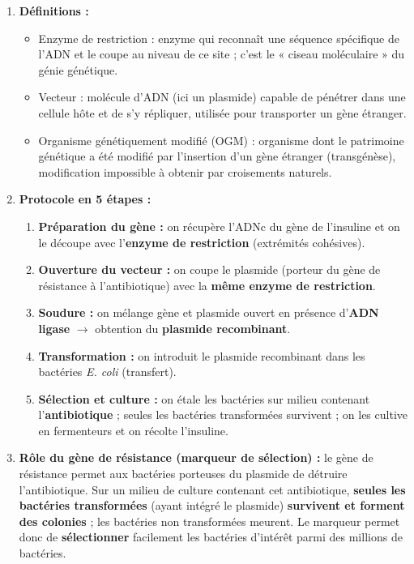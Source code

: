 \documentclass[11pt]{article}
\newcommand{\cle}[1]{{\popxbold\color{popdark}#1}}
\begin{document}
\begin{corrige}
\begin{enumerate}
\item \textbf{Définitions :}
\begin{itemize}
\item \cle{Enzyme de restriction} : enzyme qui reconnaît une séquence spécifique de l'ADN et le coupe au niveau de ce site ; c'est le « ciseau moléculaire » du génie génétique.
\item \cle{Vecteur} : molécule d'ADN (ici un plasmide) capable de pénétrer dans une cellule hôte et de s'y répliquer, utilisée pour transporter un gène étranger.
\item \cle{Organisme génétiquement modifié (OGM)} : organisme dont le patrimoine génétique a été modifié par l'insertion d'un gène étranger (transgénèse), modification impossible à obtenir par croisements naturels.
\end{itemize}
\item \textbf{Protocole en 5 étapes :}
\begin{enumerate}
\item \textbf{Préparation du gène :} on récupère l'ADNc du gène de l'insuline et on le découpe avec l'\textbf{enzyme de restriction} (extrémités cohésives).
\item \textbf{Ouverture du vecteur :} on coupe le plasmide (porteur du gène de résistance à l'antibiotique) avec la \textbf{même enzyme de restriction}.
\item \textbf{Soudure :} on mélange gène et plasmide ouvert en présence d'\textbf{ADN ligase} $\rightarrow$ obtention du \textbf{plasmide recombinant}.
\item \textbf{Transformation :} on introduit le plasmide recombinant dans les bactéries \emph{E. coli} (transfert).
\item \textbf{Sélection et culture :} on étale les bactéries sur milieu contenant l'\textbf{antibiotique} ; seules les bactéries transformées survivent ; on les cultive en fermenteurs et on récolte l'insuline.
\end{enumerate}
\item \textbf{Rôle du gène de résistance (marqueur de sélection) :} le gène de résistance permet aux bactéries porteuses du plasmide de détruire l'antibiotique. Sur un milieu de culture contenant cet antibiotique, \textbf{seules les bactéries transformées} (ayant intégré le plasmide) \textbf{survivent et forment des colonies} ; les bactéries non transformées meurent. Le marqueur permet donc de \textbf{sélectionner} facilement les bactéries d'intérêt parmi des millions de bactéries.

\end{enumerate}
\end{corrige}
\end{document}
